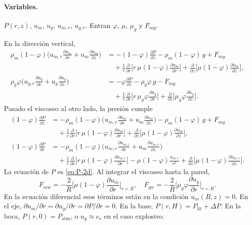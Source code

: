 \documentclass[11pt,a4paper]{article}
\newcommand{\p}{\partial}
\begin{document}
\paragraph{Variables.}
$P(r,z)$, $u_m$, $u_g$, $u_{m,r}$, $u_{g,r}$. Entran $\varphi$,
$\mu$, $\mu_g$ y $F_{mg}$.

En la dirección vertical,
\begin{align}
\label{eq:mom-mz}
\rho_m(1-\varphi)\Biggl(
u_{m,r}\frac{\p u_m}{\p r}+u_m\frac{\p u_m}{\p z}
\Biggr)
&=
-(1-\varphi)\frac{\p P}{\p z}
-\rho_m(1-\varphi)\,g
+F_{mg}
\nonumber\\
&\quad
+\frac{1}{r}\frac{\p}{\p r}\Biggl[
r\,\mu(1-\varphi)\frac{\p u_m}{\p r}
\Biggr]
+\frac{\p}{\p z}\Biggl[
\mu(1-\varphi)\frac{\p u_m}{\p z}
\Biggr],
\\
\label{eq:mom-gz}
\rho_g\varphi\Biggl(
u_{g,r}\frac{\p u_g}{\p r}+u_g\frac{\p u_g}{\p z}
\Biggr)
&=
-\varphi\frac{\p P}{\p z}
-\rho_g\varphi\,g
-F_{mg}
\nonumber\\
&\quad
+\frac{1}{r}\frac{\p}{\p r}\Biggl[
r\,\mu_g\varphi\frac{\p u_g}{\p r}
\Biggr]
+\frac{\p}{\p z}\Biggl[
\mu_g\varphi\frac{\p u_g}{\p z}
\Biggr].
\end{align}
Pasado el viscoseo al otro lado, la presión cumple
\begin{equation}
\label{eq:P-2d}
\begin{aligned}
(1-\varphi)\frac{\p P}{\p z}
&=
-\rho_m(1-\varphi)\Biggl(
u_{m,r}\frac{\p u_m}{\p r}+u_m\frac{\p u_m}{\p z}
\Biggr)
-\rho_m(1-\varphi)\,g
+F_{mg}
\\
&\quad
+\frac{1}{r}\frac{\p}{\p r}\Biggl[
r\,\mu(1-\varphi)\frac{\p u_m}{\p r}
\Biggr]
+\frac{\p}{\p z}\Biggl[
\mu(1-\varphi)\frac{\p u_m}{\p z}
\Biggr],
\\[0.35em]
(1-\varphi)\frac{\p P}{\p r}
&=
-\rho_m(1-\varphi)\Biggl(
u_{m,r}\frac{\p u_{m,r}}{\p r}+u_m\frac{\p u_{m,r}}{\p z}
\Biggr)
\\
&\quad
+\frac{1}{r}\frac{\p}{\p r}\Biggl[
r\,\mu(1-\varphi)\frac{\p u_{m,r}}{\p r}
\Biggr]
-\mu(1-\varphi)\frac{u_{m,r}}{r^2}
+\frac{\p}{\p z}\Biggl[
\mu(1-\varphi)\frac{\p u_{m,r}}{\p z}
\Biggr].
\end{aligned}
\end{equation}
La ecuación de $P$ es \eqref{eq:P-2d}. Al integrar el viscoseo hasta
la pared,
\begin{equation}
\label{eq:Fmw}
F_{mw}
=-\frac{2}{R}\Biggl[\mu(1-\varphi)\frac{\p u_m}{\p r}\Biggr]_{r=R},
\quad
F_{gw}
=-\frac{2}{R}\Biggl[\mu_g\varphi\frac{\p u_g}{\p r}\Biggr]_{r=R}.
\end{equation}
En la ecuación diferencial esos términos están en la condición
$u_m(R,z)=0$. En el eje, $\p u_m/\p r=\p u_g/\p r=\p P/\p r=0$.
En la base, $P(r,H)=P_{\mathrm{lit}}+\Delta P$. En la boca,
$P(r,0)=P_{\mathrm{atm}}$, o $u_g\approx c_s$ en el caso explosivo.
\end{document}
